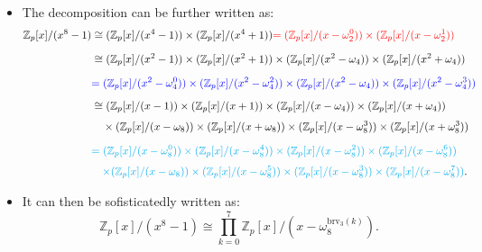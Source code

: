 \begin{frame}
    \begin{itemize}
        \item The decomposition can be further written as:
\begin{align*}
\mathbb{Z}_{p}[x]/(x^{8}-1)
&\cong (\mathbb{Z}_{p}[x]/(x^{4}-1))
        \times
        (\mathbb{Z}_{p}[x]/(x^{4}+1)) 
        {\color{red}= (\mathbb{Z}_{p}[x]/(x-\omega_{2}^{0}))
        \times
        (\mathbb{Z}_{p}[x]/(x-\omega_{2}^{1}))}
        \\[6pt]
&\cong (\mathbb{Z}_{p}[x]/(x^{2}-1))
        \times
        (\mathbb{Z}_{p}[x]/(x^{2}+1))
        \times
        (\mathbb{Z}_{p}[x]/(x^{2}-\omega_{4}))
        \times
        (\mathbb{Z}_{p}[x]/(x^{2}+\omega_{4})) \\[6pt]
&{\color{blue}=      (\mathbb{Z}_{p}[x]/(x^{2}-\omega_{4}^{0}))
        \times
        (\mathbb{Z}_{p}[x]/(x^{2}-\omega_{4}^{2}))
        \times
        (\mathbb{Z}_{p}[x]/(x^{2}-\omega_{4}))
        \times
        (\mathbb{Z}_{p}[x]/(x^{2}-\omega_{4}^{3}))} \\[6pt]
&\cong (\mathbb{Z}_{p}[x]/(x-1))
        \times
        (\mathbb{Z}_{p}[x]/(x+1))
        \times
        (\mathbb{Z}_{p}[x]/(x-\omega_{4}))
        \times
        (\mathbb{Z}_{p}[x]/(x+\omega_{4})) \\[3pt]
&\quad\times (\mathbb{Z}_{p}[x]/(x-\omega_{8}))
        \times
        (\mathbb{Z}_{p}[x]/(x+\omega_{8}))
        \times
        (\mathbb{Z}_{p}[x]/(x-\omega_{8}^{3}))
        \times
        (\mathbb{Z}_{p}[x]/(x+\omega_{8}^{3})) \\[6pt]
&{\color{cyan}=      (\mathbb{Z}_{p}[x]/(x-\omega_{8}^{0}))
        \times
        (\mathbb{Z}_{p}[x]/(x-\omega_{8}^{4}))
        \times
        (\mathbb{Z}_{p}[x]/(x-\omega_{8}^{2}))
        \times
    (\mathbb{Z}_{p}[x]/(x-\omega_{8}^{6}))} \\[3pt]
&\quad{\color{cyan}\times (\mathbb{Z}_{p}[x]/(x-\omega_{8}))
        \times
        (\mathbb{Z}_{p}[x]/(x-\omega_{8}^{5}))
        \times
        (\mathbb{Z}_{p}[x]/(x-\omega_{8}^{3}))
        \times
        (\mathbb{Z}_{p}[x]/(x-\omega_{8}^{7}))}.
\end{align*}

        \item It can then be sofisticatedly written as:
            \[
                \mathbb{Z}_{p}[x]/(x^{8}-1) 
                \cong \prod_{k=0}^{7} \mathbb{Z}_{p}[x]/(x-\omega_{8}^{\mathrm{brv}_{3}(k)}).
            \]


    \end{itemize}
\end{frame}


